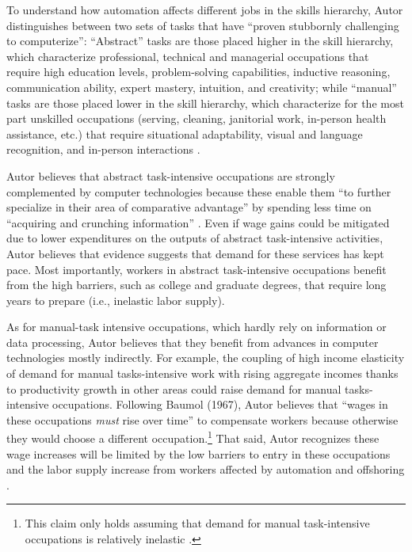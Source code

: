 \documentclass[version=last,draft=false,paper=A4,portrait,twoside=true,twocolumn=false,headinclude=false,footinclude=false,mpinclude=true,fontsize=12,BCOR=20mm,DIV=calc,pagesize=auto,open=right,chapterprefix=true,numbers=autoendperiod,headsepline=false,headings=twolinechapter,parskip=false]{scrbook}
\begin{document}
To understand how automation affects different jobs in the skills
hierarchy, Autor distinguishes between two sets of tasks that have ``proven
stubbornly challenging to computerize'': ``Abstract'' tasks are those
placed higher in the skill hierarchy, which characterize professional,
technical and managerial occupations that require high education levels,
problem-solving capabilities, inductive reasoning, communication ability,
expert mastery, intuition, and creativity; while ``manual'' tasks are those
placed lower in the skill hierarchy, which characterize for the most part
unskilled occupations (serving, cleaning, janitorial work, in-person health
assistance, etc.) that require situational adaptability, visual and
language recognition, and in-person interactions \autocite[p.
9]{autor2015}. 

Autor believes that abstract task-intensive occupations are strongly
complemented by computer technologies because these enable them ``to
further specialize in their area of comparative advantage'' by spending
less time on ``acquiring and crunching information''
\autocite[p. 15]{autor2015}. Even if wage gains could be mitigated due to
lower expenditures on the outputs of abstract task-intensive activities,
Autor believes that evidence suggests that demand for these services has
kept pace. Most importantly, workers in abstract task-intensive occupations
benefit from the high barriers, such as college and graduate degrees, that
require long years to prepare (i.e., inelastic labor supply).

As for manual-task intensive occupations, which hardly rely on information
or data processing, Autor believes that they benefit from advances in
computer technologies mostly indirectly. For example, the coupling of high
income elasticity of demand for manual tasks-intensive work with rising
aggregate incomes thanks to productivity growth in other areas could raise
demand for manual tasks-intensive occupations. Following Baumol (1967),
Autor believes that ``wages in these occupations \emph{must} rise over time'' to
compensate workers because otherwise they would choose a different
occupation.\footnote{This claim only holds assuming that demand for manual task-intensive
occupations is relatively inelastic \autocite[p. 17]{autor2015}.} That said, Autor recognizes these wage increases will be
limited by the low barriers to entry in these occupations and the labor
supply increase from workers affected by automation and offshoring
\autocite[p. 17]{autor2015}.
\end{document}
